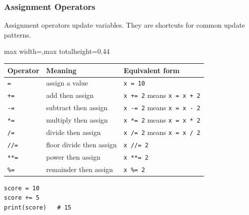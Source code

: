 \documentclass[aspectratio=169,10pt]{beamer}
\begin{document}
\begin{frame}[fragile]
\frametitle{Assignment Operators}
\begin{tcolorbox}[lecturebox,title=Key idea]
Assignment operators update variables. They are shortcuts for common update patterns.
\end{tcolorbox}

\small
\begin{adjustbox}{max width=\textwidth,max totalheight=0.44\textheight}
\begin{tabular}{@{}p{1.7cm}p{4.6cm}p{5.9cm}@{}}
\toprule
\textbf{Operator} & \textbf{Meaning} & \textbf{Equivalent form} \\
\midrule
\texttt{=} & assign a value & \texttt{x = 10} \\
\texttt{+=} & add then assign & \texttt{x += 2} means \texttt{x = x + 2} \\
\texttt{-=} & subtract then assign & \texttt{x -= 2} means \texttt{x = x - 2} \\
\texttt{*=} & multiply then assign & \texttt{x *= 2} means \texttt{x = x * 2} \\
\texttt{/=} & divide then assign & \texttt{x /= 2} means \texttt{x = x / 2} \\
\texttt{//=} & floor divide then assign & \texttt{x //= 2} \\
\texttt{**=} & power then assign & \texttt{x **= 2} \\
\texttt{\%=} & remainder then assign & \texttt{x \%= 2} \\
\bottomrule
\end{tabular}
\end{adjustbox}

\begin{lstlisting}[style=pycodesmall]
score = 10
score += 5
print(score)   # 15
\end{lstlisting}
\end{frame}
\end{document}
